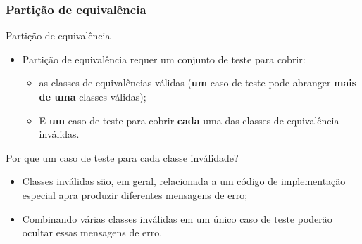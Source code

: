 \begin{frame}[hasnext=true, hasprev=true]
\frametitle{Partição de equivalência}

\begin{block:fact}{Partição de equivalência}
\begin{itemize}
	\item Partição de equivalência requer um conjunto de teste para cobrir:
	\begin{itemize}
		\item as classes de equivalências válidas (\textbf{um} caso de teste pode abranger
		\textbf{mais de uma} classes válidas);

		\item E \textbf{um} caso de teste para cobrir \textbf{cada} uma das
		classes de equivalência inválidas.
	\end{itemize}
\end{itemize}
\end{block:fact}

\begin{block:fact}{Por que um caso de teste para cada classe inválidade?}
\begin{itemize}
	\item Classes inválidas são, em geral, relacionada a um código de implementação
	especial apra produzir diferentes mensagens de erro;

	\item Combinando várias classes inválidas em um único caso de teste poderão
	ocultar essas mensagens de erro.
\end{itemize}
\end{block:fact}
\end{frame}


